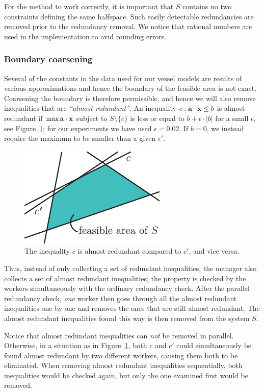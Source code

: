 For the method to work correctly, it is important that $S$ contains no two constraints defining the same halfspace. Such easily detectable redundancies are removed prior to the redundancy removal. We notice that rational numbers are used in the implementation to avid rounding errors. 

\subsubsection{Boundary coarsening} 
Several of the constants in the data used for our vessel models are results of various approximations and hence the boundary of the feasible area is not exact. Coarsening the boundary is therefore permissible, and hence we will also remove inequalities that are \emph{``almost redundant''}. An inequality $c: \mathbf{a}\cdot\mathbf{x}\leq b$ is almost redundant if $\max \mathbf{a}\cdot\mathbf{x}$  subject to $S\setminus\{c\}$ is less or equal to $b + \epsilon\cdot |b|$ for a small $\epsilon$, see Figure~\ref{fig:almostRedundant}; for our experiments we have used $\epsilon = 0.02$. If $b=0$, we instead require the maximum to be smaller than a given $\epsilon'$. 

\begin{figure}[htbp]
	\centering
		\includegraphics[scale=0.9]{figures/almostRedundant.pdf}
	\caption{The inequality $c$ is almost redundant compared to $c'$, and vice versa.}
	\label{fig:almostRedundant}
\end{figure}

Thus, instead of only collecting a set of redundant inequalities, the manager also collects a set of almost redundant inequalities; the property is checked by the workers simultaneously with the ordinary redundancy check. After the parallel redundancy check, \emph{one} worker then goes through all the almost redundant inequalities one by one and removes the ones that are still almost redundant. The almost redundant inequalities found this way is then removed from the system $S$.  

Notice that almost redundant inequalities can \emph{not} be removed in parallel. Otherwise, in a situation as in Figure~\ref{fig:almostRedundant}, both $c$ and $c'$ could simultaneously be found almost redundant by two different workers, causing them both to be eliminated. When removing almost redundant inequalities sequentially, both inequalities would be checked again, but only the one examined first would be removed.

